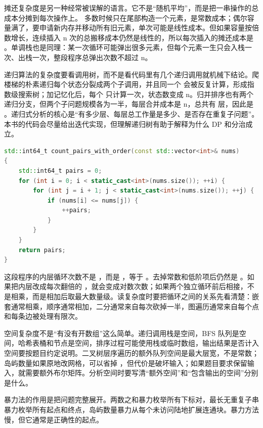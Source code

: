 摊还复杂度是另一种经常被误解的语言。它不是“随机平均”，而是把一串操作的总成本分摊到每次操作上。  多数时候只在尾部构造一个元素，是常数成本；偶尔容量满了，要申请新内存并移动所有旧元素，单次可能是线性成本。但如果容量按倍数增长，连续插入 n 次的总搬移成本仍然是线性的，所以每次插入的摊还成本是 。单调栈也是同理：某一次循环可能弹出很多元素，但每个元素一生只会入栈一次、出栈一次，整段程序总弹出次数不超过 n。

递归算法的复杂度要看调用树，而不是看代码里有几个递归调用就机械下结论。爬楼梯的朴素递归每个状态分裂成两个子调用，并且同一个  会被反复计算，形成指数级搜索树；加记忆化后，每个  只计算一次，状态数变成 n。归并排序也有两个递归分支，但两个子问题规模各为一半，每层合并成本是 n，总共有  层，因此是 。递归式分析的核心是“有多少层、每层总工作量是多少、是否存在重复子问题”。本书的代码会尽量给出迭代实现，但理解递归树有助于解释为什么 DP 和分治成立。

\begin{lstlisting}[language=C++,caption={从循环结构读出复杂度}]
std::int64_t count_pairs_with_order(const std::vector<int>& nums)
{
    std::int64_t pairs = 0;
    for (int i = 0; i < static_cast<int>(nums.size()); ++i) {
        for (int j = i + 1; j < static_cast<int>(nums.size()); ++j) {
            if (nums[i] <= nums[j]) {
                ++pairs;
            }
        }
    }
    return pairs;
}
\end{lstlisting}

这段程序的内层循环次数不是 ，而是 ，等于 。去掉常数和低阶项后仍然是 。如果把内层改成每次翻倍的 ，就会变成对数次数；如果两个独立循环前后相接，不是相乘，而是相加后取最大数量级。读复杂度时要把循环之间的关系先看清楚：嵌套通常相乘，顺序通常相加，二分通常来自每次砍掉一半，图遍历通常来自每个点和每条边被处理有限次。

空间复杂度不是“有没有开数组”这么简单。递归调用栈是空间，BFS 队列是空间，哈希表桶和节点是空间，排序过程可能使用栈或临时数组，输出结果是否计入空间要按题目约定说明。二叉树层序遍历的额外队列空间是最大层宽，不是常数；岛屿数量如果原地改网格，可以省掉 ，但代价是破坏输入；如果题目要求保留输入，就需要额外布尔矩阵。分析空间时要写清“额外空间”和“包含输出的空间”分别是什么。

暴力法的作用是把问题完整展开。两数之和暴力枚举所有下标对，最长无重复子串暴力枚举所有起点和终点，岛屿数量暴力从每个未访问陆地扩展连通块。暴力方法慢，但它通常是正确性的起点。

